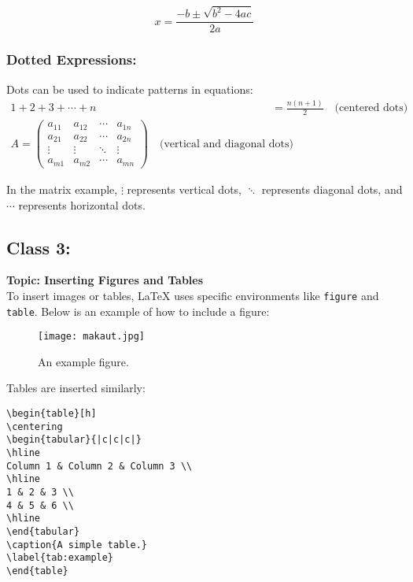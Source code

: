 \begin{equation}
    x = \frac{-b \pm \sqrt{b^2 - 4ac}}{2a}
\end{equation}

\subsubsection{Dotted Expressions:}
Dots can be used to indicate patterns in equations:
\begin{align}
    1 + 2 + 3 + \cdots + n &= \frac{n(n+1)}{2} \quad \text{(centered dots)} \\
    A = \begin{pmatrix} 
            a_{11} & a_{12} & \cdots & a_{1n} \\
            a_{21} & a_{22} & \cdots & a_{2n} \\
            \vdots & \vdots & \ddots & \vdots \\
            a_{m1} & a_{m2} & \cdots & a_{mn} 
        \end{pmatrix} \quad \text{(vertical and diagonal dots)}
\end{align}

In the matrix example, $\vdots$ represents vertical dots, $\ddots$ represents diagonal dots, and $\cdots$ represents horizontal dots.

\subsection{Class 3:}
\textbf{Topic: Inserting Figures and Tables} \\

To insert images or tables, \LaTeX{} uses specific environments like \texttt{figure} and \texttt{table}. Below is an example of how to include a figure:

\begin{figure}[h]
    \centering
    \texttt{[image: makaut.jpg]}
    \caption{An example figure.}
    \label{fig:fig_example}
\end{figure}

Tables are inserted similarly:
\begin{verbatim}
\begin{table}[h]
\centering
\begin{tabular}{|c|c|c|}
\hline
Column 1 & Column 2 & Column 3 \\
\hline
1 & 2 & 3 \\
4 & 5 & 6 \\
\hline
\end{tabular}
\caption{A simple table.}
\label{tab:example}
\end{table}
\end{verbatim}

